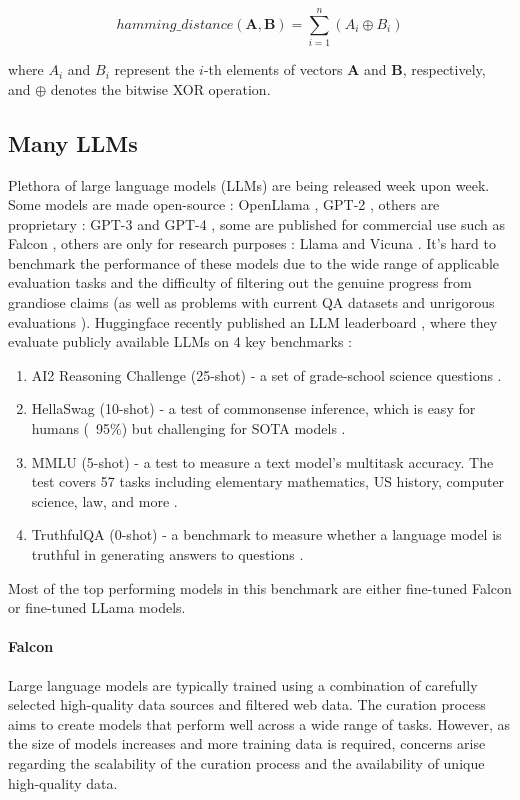\documentclass[a4paper,12pt]{article}
\begin{document}
$$
hamming\_distance(\mathbf{A}, \mathbf{B}) = \sum_{i=1}^{n} (A_i \oplus B_i)
$$

where $A_i$ and $B_i$ represent the $i$-th elements of vectors $\mathbf{A}$ and $\mathbf{B}$, respectively, and $\oplus$ denotes the bitwise XOR operation.

\subsection{Many LLMs}
Plethora of large language models (LLMs) are being released week upon week. Some models are made open-source : OpenLlama \cite{openllama}, GPT-2 \cite{gpt2}, others are proprietary : GPT-3\cite{gpt3} and GPT-4 \cite{gpt4}, some are published for commercial use such as Falcon \cite{falcon}, others are only for research purposes : Llama \cite{llama} and Vicuna \cite{vicuna}.
It's hard to benchmark the performance of these models due to the wide range of applicable evaluation tasks and the difficulty of filtering out the genuine progress from grandiose claims (as well as problems with current QA datasets and unrigorous evaluations \cite{unfairdataset}).
Huggingface recently published an LLM leaderboard \cite{open-llm-leaderboard}, where they evaluate publicly available LLMs on 4 key benchmarks : 

\begin{enumerate}
	\item AI2 Reasoning Challenge (25-shot) - a set of grade-school science questions \cite{AI2}.
	\item HellaSwag (10-shot) - a test of commonsense inference, which is easy for humans (~95\%) but challenging for SOTA models \cite{hellaswag}. 
	\item MMLU (5-shot) - a test to measure a text model’s multitask accuracy. The test covers 57 tasks including elementary mathematics, US history, computer science, law, and more \cite{MMLU}.
	\item TruthfulQA (0-shot) - a benchmark to measure whether a language model is truthful in generating answers to questions \cite{truthfulqa}.
\end{enumerate}

Most of the top performing models in this benchmark are either fine-tuned Falcon \cite{falcon} or fine-tuned LLama \cite{llama} models.

\paragraph*{Falcon}
Large language models are typically trained using a combination of carefully selected high-quality data sources and filtered web data. 
The curation process aims to create models that perform well across a wide range of tasks. 
However, as the size of models increases and more training data is required, concerns arise regarding the scalability of the curation process and the availability of unique high-quality data.
\end{document}

